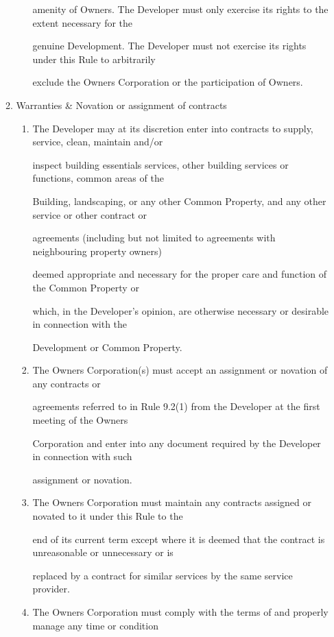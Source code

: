 \documentclass{article}
\begin{document}
\begin{enumerate}[label=\arabic*.]
\begin{enumerate}[label=\arabic{enumi}.\arabic*.]
\begin{enumerate}[label=(\arabic*)]
amenity of Owners. The Developer must only exercise its rights to the extent necessary for the 

genuine Development. The Developer must not exercise its rights under this Rule to arbitrarily 

exclude the Owners Corporation or the participation of Owners. 

\end{enumerate}
\item  Warranties \& Novation or assignment of contracts 

\begin{enumerate}[label=(\arabic*)]
\item  The Developer may at its discretion enter into contracts to supply, service, clean, maintain and/or 

inspect building essentials services, other building services or functions, common areas of the 

Building, landscaping, or any other Common Property, and any other service or other contract or 

agreements (including but not limited to agreements with neighbouring property owners) 

deemed appropriate and necessary for the proper care and function of the Common Property or 

which, in the Developer’s opinion, are otherwise necessary or desirable in connection with the 

Development or Common Property. 

\item  The Owners Corporation(s) must accept an assignment or novation of any contracts or 

agreements referred to in Rule 9.2(1) from the Developer at the first meeting of the Owners 

\newpage

Corporation and enter into any document required by the Developer in connection with such 

assignment or novation. 

\item  The Owners Corporation must maintain any contracts assigned or novated to it under this Rule to the 

end of its current term except where it is deemed that the contract is unreasonable or unnecessary or is 

replaced by a contract for similar services by the same service provider. 

\item  The Owners Corporation must comply with the terms of and properly manage any time or condition 


\end{enumerate}
\end{enumerate}
\end{enumerate}
\end{document}
